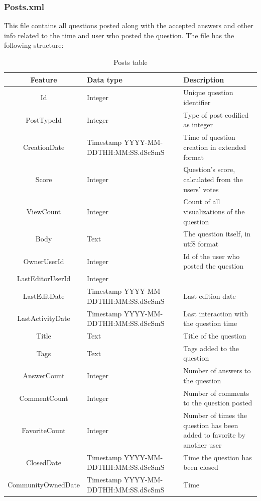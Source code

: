 \documentclass[11pt]{article} %
\begin{document}
\newpage

    \subsubsection{Posts.xml}

      This file contains all questions posted along with the accepted answers and other info related to the time and user who posted the question. The file has the following structure:

      \begin{table}[!ht]
        \centering
        \begin{tabular}{|c|p{}|p{}|}
          \hline

          Feature & Data type & Description \\ \hline
          Id & Integer & Unique question identifier \\ \hline
          PostTypeId & Integer & Type of post codified as integer \\ \hline
          CreationDate & Timestamp YYYY-MM-DDTHH:MM:SS.dScSmS & Time of question creation in extended format \\ \hline
          Score & Integer & Question's score, calculated from the users' votes \\ \hline
          ViewCount & Integer & Count of all visualizations of the question \\ \hline
          Body & Text & The question itself, in utf8 format \\ \hline
          OwnerUserId & Integer & Id of the user who posted the question \\ \hline
          LastEditorUserId & Integer & \\ \hline
          LastEditDate & Timestamp YYYY-MM-DDTHH:MM:SS.dScSmS & Last edition date \\ \hline
          LastActivityDate & Timestamp YYYY-MM-DDTHH:MM:SS.dScSmS & Last interaction with the question time \\ \hline
          Title & Text & Title of the question \\ \hline
          Tags & Text & Tags added to the question \\ \hline
          AnswerCount & Integer & Number of answers to the question \\ \hline
          CommentCount & Integer & Number of comments to the question posted \\ \hline
          FavoriteCount & Integer & Number of times the question has been added to favorite by another user \\ \hline
          ClosedDate & Timestamp YYYY-MM-DDTHH:MM:SS.dScSmS & Time the question has been closed \\ \hline
          CommunityOwnedDate & Timestamp YYYY-MM-DDTHH:MM:SS.dScSmS & Time \\

          \hline
        \end{tabular}
        \caption{Posts table}
        \label{tab:posts}
      \end{table}
\end{document}
